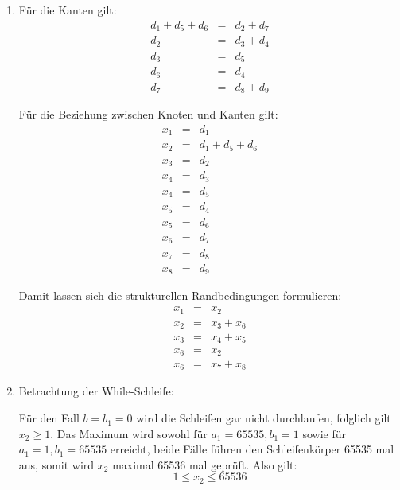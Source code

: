 \documentclass[DIN, pagenumber=false, fontsize=11pt, parskip=half]{scrartcl}
\begin{document}
    \begin{enumerate}[label=\alph*)]
        \item
            Für die Kanten gilt:
            \begin{eqnarray}
                d_1 + d_5 + d_6 &=& d_2 + d_7 \\
                d_2 &=& d_3 + d_4 \\
                d_3 &=& d_5 \\
                d_6 &=& d_4 \\
                d_7 &=& d_8 + d_9
            \end{eqnarray} 

            Für die Beziehung zwischen Knoten und Kanten gilt:
            \begin{eqnarray}
                x_1 &=& d_1 \\
                x_2 &=& d_1 + d_5 + d_6 \\
                x_3 &=& d_2 \\
                x_4 &=& d_3 \\
                x_4 &=& d_5 \\
                x_5 &=& d_4 \\
                x_5 &=& d_6 \\
                x_6 &=& d_7 \\
                x_7 &=& d_8 \\
                x_8 &=& d_9
            \end{eqnarray}

            Damit lassen sich die strukturellen Randbedingungen formulieren:
            \begin{eqnarray}
                x_1 &=& x_2 \\
                x_2 &=& x_3 + x_6 \\
                x_3 &=& x_4 + x_5 \\
                x_6 &=& x_2 \\
                x_6 &=& x_7 + x_8
            \end{eqnarray}
        \item
            Betrachtung der While-Schleife:
            
            Für den Fall $b=b_1=0$ wird die Schleifen gar nicht durchlaufen,
            folglich gilt $x_2 \geq 1$. Das Maximum wird sowohl für
            $a_1 = 65535, b_1 = 1$ sowie für $a_1=1, b_1=65535$ erreicht, beide
            Fälle führen den Schleifenkörper 65535 mal aus, somit wird $x_2$
            maximal 65536 mal geprüft. Also gilt:
            \begin{equation}
                1 \leq x_2 \leq 65536
            \end{equation}


\end{enumerate}
\end{document}
